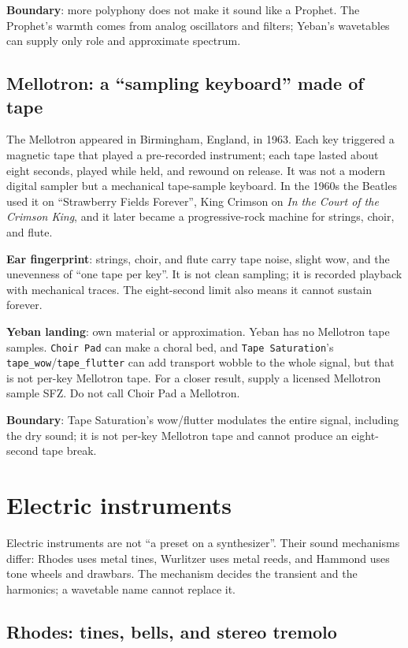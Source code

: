 \textbf{Boundary}: more polyphony does not make it sound like a Prophet. The
Prophet's warmth comes from analog oscillators and filters; Yeban's
wavetables can supply only role and approximate spectrum.

\subsection{Mellotron: a ``sampling keyboard'' made of tape}
\label{sec:iconic-mellotron}

The Mellotron appeared in Birmingham, England, in 1963. Each key triggered a
magnetic tape that played a pre-recorded instrument; each tape lasted about
eight seconds, played while held, and rewound on release. It was not a modern
digital sampler but a mechanical tape-sample keyboard. In the 1960s the
Beatles used it on ``Strawberry Fields Forever'', King Crimson on \emph{In
the Court of the Crimson King}, and it later became a progressive-rock
machine for strings, choir, and flute.

\textbf{Ear fingerprint}: strings, choir, and flute carry tape noise, slight
wow, and the unevenness of ``one tape per key''. It is not clean sampling;
it is recorded playback with mechanical traces. The eight-second limit also
means it cannot sustain forever.

\textbf{Yeban landing}: own material or approximation. Yeban has no
Mellotron tape samples. \texttt{Choir Pad} can make a choral bed, and
\texttt{Tape Saturation}'s \texttt{tape\_wow}/\texttt{tape\_flutter} can add
transport wobble to the whole signal, but that is not per-key Mellotron tape.
For a closer result, supply a licensed Mellotron sample SFZ. Do not call
Choir Pad a Mellotron.

\textbf{Boundary}: Tape Saturation's wow/flutter modulates the entire signal,
including the dry sound; it is not per-key Mellotron tape and cannot produce
an eight-second tape break.

\section{Electric instruments}
\label{sec:iconic-electric}

Electric instruments are not ``a preset on a synthesizer''. Their sound
mechanisms differ: Rhodes uses metal tines, Wurlitzer uses metal reeds, and
Hammond uses tone wheels and drawbars. The mechanism decides the transient
and the harmonics; a wavetable name cannot replace it.

\subsection{Rhodes: tines, bells, and stereo tremolo}
\label{sec:iconic-rhodes}

